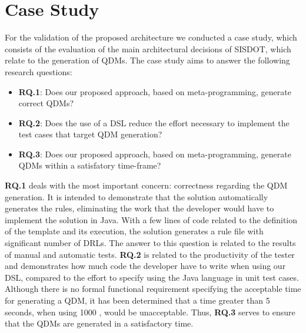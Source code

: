 \section{Case Study}
\label{sec:case_study} 


For the validation of the proposed architecture we conducted a case study, which consists of the evaluation of the main 
architectural decisions of SISDOT, which relate to the generation of QDMs. The case study aims to answer the 
following research questions:

\begin{itemize}

\item \textbf{RQ.1}: Does our proposed approach, based on meta-programming, generate correct QDMs?

\item \textbf{RQ.2}: Does the use of a DSL reduce the effort necessary to implement the test cases that target QDM generation? 

\item \textbf{RQ.3}: Does our proposed approach, based on meta-programming, generate QDMs within a satisfatory time-frame?

\end{itemize}


\textbf{RQ.1} deals with the most important concern: correctness regarding the QDM generation. It is intended 
to demonstrate that the solution automatically generates the rules, eliminating the work that the developer 
would have to implement the solution in Java. With a few lines of code related to the definition of the template 
and its execution, the solution generates a rule file with significant number of DRLs. The answer to this question 
is related to the results of manual and automatic tests.
\textbf{RQ.2} is related to the productivity of the tester and demonstrates how much code the 
developer have to write when using our DSL, compared to the effort to specify \callers using the Java language in 
unit test cases. Although there is no formal functional requirement specifying the  acceptable time for generating a QDM, 
it has been determined that a time greater than 5 seconds, when using 1000 \callers, would be unacceptable. 
Thus, \textbf{RQ.3} serves to ensure that the QDMs are generated in a satisfactory time.

